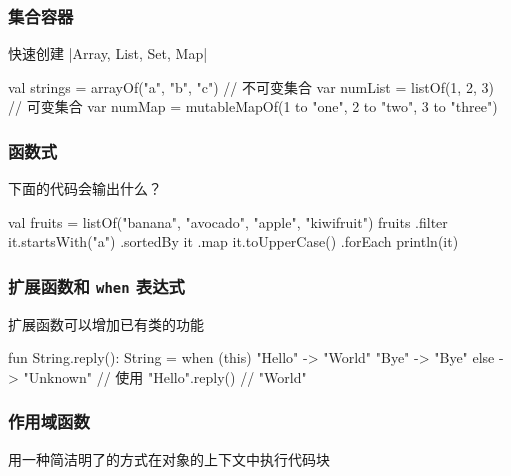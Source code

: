 \begin{frame}[fragile]
\frametitle{集合容器}
\begin{quotebox}
    快速创建 |Array, List, Set, Map|
\end{quotebox}
\begin{kotlincode}
    val strings = arrayOf("a", "b", "c")
    // 不可变集合
    var numList = listOf(1, 2, 3)
    // 可变集合
    var numMap = mutableMapOf(1 to "one", 2 to "two", 3 to "three")
\end{kotlincode}
\end{frame}

\begin{frame}[fragile]
\frametitle{函数式}
\begin{quotebox}[penrosegreen]
    下面的代码会输出什么？
\end{quotebox}
\begin{kotlincode}[emph={[1]sortedBy,filter,map,forEach}]
    val fruits = listOf("banana", "avocado", "apple", "kiwifruit")
    fruits
      .filter { it.startsWith("a") }
      .sortedBy { it }
      .map { it.toUpperCase() }
      .forEach { println(it) }
\end{kotlincode}
\end{frame}

\begin{frame}[fragile]
\frametitle{扩展函数和 \texttt{when} 表达式}
\begin{quotebox}
    扩展函数可以增加已有类的功能
\end{quotebox}
\begin{kotlincode}
    fun String.reply(): String =
        when (this) {
            "Hello"    -> "World"
            "Bye"      -> "Bye"
            else       -> "Unknown"
        }
    // 使用
    "Hello".reply() // "World"
\end{kotlincode}
\end{frame}

\begin{frame}[fragile]
\frametitle{作用域函数}
\begin{quotebox}
    用一种简洁明了的方式在对象的上下文中执行代码块
\end{quotebox}
\end{frame}

